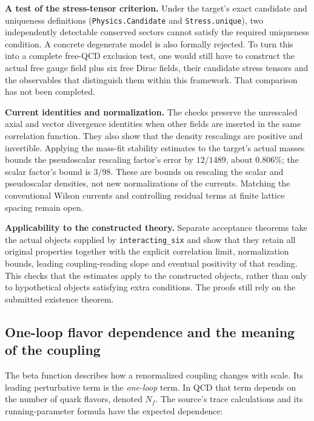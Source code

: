 \documentclass[
  11pt,
]{article}
\begin{document}
\textbf{A test of the stress-tensor criterion.} Under the target's exact
candidate and uniqueness definitions
({\small \nolinkurl{Physics.Candidate}} and
{\small \nolinkurl{Stress.unique}}), two independently detectable
conserved sectors cannot satisfy the required uniqueness condition. A
concrete degenerate model is also formally rejected. To turn this into a
complete free-QCD exclusion test, one would still have to construct the
actual free gauge field plus six free Dirac fields, their candidate
stress tensors and the observables that distinguish them within this
framework. That comparison has not been completed.

\textbf{Current identities and normalization.} The checks preserve the
unrescaled axial and vector divergence identities when other fields are
inserted in the same correlation function. They also show that the
density rescalings are positive and invertible. Applying the mass-fit
stability estimates to the target's actual masses bounds the
pseudoscalar rescaling factor's error by \(12/1489\), about \(0.806\%\);
the scalar factor's bound is \(3/98\). These are bounds on rescaling the
scalar and pseudoscalar densities, not new normalizations of the
currents. Matching the conventional Wilson currents and controlling
residual terms at finite lattice spacing remain open.

\textbf{Applicability to the constructed theory.} Separate acceptance
theorems take the actual objects supplied by
{\small \nolinkurl{interacting_six}} and show that they retain all
original properties together with the explicit correlation limit,
normalization bounds, leading coupling-reading slope and eventual
positivity of that reading. This checks that the estimates apply to the
constructed objects, rather than only to hypothetical objects satisfying
extra conditions. The proofs still rely on the submitted existence
theorem.

\subsection{One-loop flavor dependence and the meaning of the
coupling}\label{one-loop-flavor-dependence-and-the-meaning-of-the-coupling}

The beta function describes how a renormalized coupling changes with
scale. Its leading perturbative term is the \emph{one-loop} term. In QCD
that term depends on the number of quark flavors, denoted \(N_f\). The
source's trace calculations and its running-parameter formula have the
expected dependence:
\end{document}

